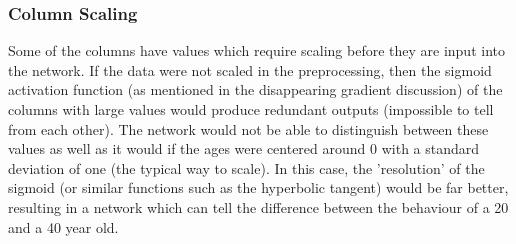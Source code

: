         \subsubsection{Column Scaling}
            Some of the columns have values which require scaling before they are input into the network. If the data were not scaled in the preprocessing, then the sigmoid activation function (as mentioned in the disappearing gradient discussion) of the columns with large values would produce redundant outputs (impossible to tell from each other). The network would not be able to distinguish between these values as well as it would if the ages were centered around 0 with a standard deviation of one (the typical way to scale). In this case, the 'resolution' of the sigmoid (or similar functions such as the hyperbolic tangent) would be far better, resulting in a network which can tell the difference between the behaviour of a 20 and a 40 year old.
